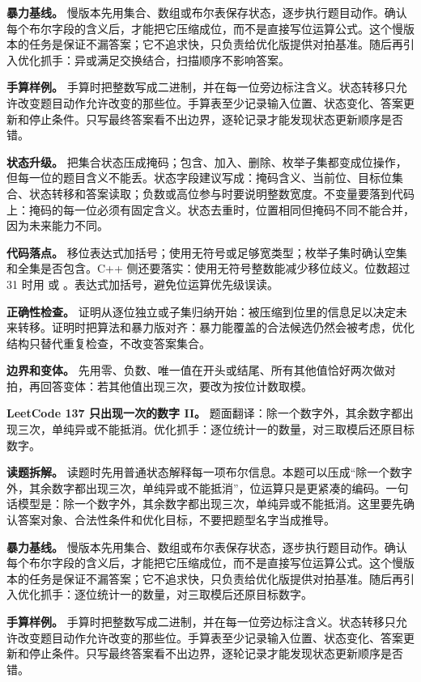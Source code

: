 \textbf{暴力基线。} 慢版本先用集合、数组或布尔表保存状态，逐步执行题目动作。确认每个布尔字段的含义后，才能把它压缩成位，而不是直接写位运算公式。这个慢版本的任务是保证不漏答案；它不追求快，只负责给优化版提供对拍基准。随后再引入优化抓手：异或满足交换结合，扫描顺序不影响答案。

\textbf{手算样例。} 手算时把整数写成二进制，并在每一位旁边标注含义。状态转移只允许改变题目动作允许改变的那些位。手算表至少记录输入位置、状态变化、答案更新和停止条件。只写最终答案看不出边界，逐轮记录才能发现状态更新顺序是否错。

\textbf{状态升级。} 把集合状态压成掩码；包含、加入、删除、枚举子集都变成位操作，但每一位的题目含义不能丢。状态字段建议写成：掩码含义、当前位、目标位集合、状态转移和答案读取；负数或高位参与时要说明整数宽度。不变量要落到代码上：掩码的每一位必须有固定含义。状态去重时，位置相同但掩码不同不能合并，因为未来能力不同。

\textbf{代码落点。} 移位表达式加括号；使用无符号或足够宽类型；枚举子集时确认空集和全集是否包含。C++ 侧还要落实：使用无符号整数能减少移位歧义。位数超过 31 时用  或 。表达式加括号，避免位运算优先级误读。

\textbf{正确性检查。} 证明从逐位独立或子集归纳开始：被压缩到位里的信息足以决定未来转移。证明时把算法和暴力版对齐：暴力能覆盖的合法候选仍然会被考虑，优化结构只替代重复检查，不改变答案集合。

\textbf{边界和变体。} 先用零、负数、唯一值在开头或结尾、所有其他值恰好两次做对拍，再回答变体：若其他值出现三次，要改为按位计数取模。

\noindent\textbf{LeetCode 137 只出现一次的数字 II。} 题面翻译：除一个数字外，其余数字都出现三次，单纯异或不能抵消。优化抓手：逐位统计一的数量，对三取模后还原目标数字。

\textbf{读题拆解。} 读题时先用普通状态解释每一项布尔信息。本题可以压成“除一个数字外，其余数字都出现三次，单纯异或不能抵消”，位运算只是更紧凑的编码。一句话模型是：除一个数字外，其余数字都出现三次，单纯异或不能抵消。这里要先确认答案对象、合法性条件和优化目标，不要把题型名字当成推导。

\textbf{暴力基线。} 慢版本先用集合、数组或布尔表保存状态，逐步执行题目动作。确认每个布尔字段的含义后，才能把它压缩成位，而不是直接写位运算公式。这个慢版本的任务是保证不漏答案；它不追求快，只负责给优化版提供对拍基准。随后再引入优化抓手：逐位统计一的数量，对三取模后还原目标数字。

\textbf{手算样例。} 手算时把整数写成二进制，并在每一位旁边标注含义。状态转移只允许改变题目动作允许改变的那些位。手算表至少记录输入位置、状态变化、答案更新和停止条件。只写最终答案看不出边界，逐轮记录才能发现状态更新顺序是否错。

